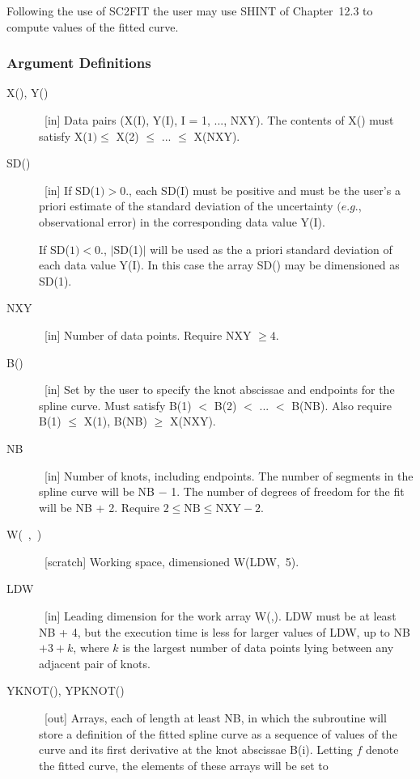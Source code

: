 \documentclass[twoside]{MATH77}
\begin{document}
Following the use of SC2FIT the user may use SHINT of Chapter~12.3 to compute
values of the fitted curve.

\subsubsection{Argument Definitions}
\begin{description}
\item[X(), Y()]  \ [in] Data pairs (X(I), Y(I), I = 1, ..., NXY). The
contents of X() must satisfy X($1)\leq $ X(2) $\leq $ ... $\leq $ X(NXY).

\item[SD()]  \ [in] If SD($1)>0.$, each SD(I) must be positive and must be
the user's a priori estimate of the standard deviation of the uncertainty $%
(e.g.$, observational error) in the corresponding data value Y(I).

If SD($1)<0.$, $|$SD(1)$|$ will be used as the a priori standard deviation
of each data value Y(I). In this case the array SD() may be dimensioned as
SD(1).

\item[NXY]  \ [in] Number of data points. Require NXY $\geq 4.$

\item[B()]  \ [in] Set by the user to specify the knot abscissae and
endpoints for the spline curve. Must satisfy B(1) $<$ B(2)
$<$ ... $<$ B(NB).  Also require B(1) $\leq $
X(1), B(NB) $\geq $ X(NXY).

\item[NB]  \ [in] Number of knots, including endpoints. The number of
segments in the spline curve will be NB $-$ 1. The number of degrees of freedom
for the fit will be NB + 2. Require $2\leq \text{NB}\leq \text{NXY}-2.$

\item[W(\ ,\ )]  \ [scratch] Working space, dimensioned W(LDW,~5).

\item[LDW]  \ [in] Leading dimension for the work array W(,). LDW must be at
least NB + 4, but the execution time is less for larger values of LDW, up to
NB$+3+k$, where $k$ is the largest number of data points lying between any
adjacent pair of knots.

\item[YKNOT(), YPKNOT()]  \ [out] Arrays, each of length at least NB, in
which the subroutine will store a definition of the fitted spline curve as a
sequence of values of the curve and its first derivative at the knot
abscissae B(i). Letting $f$ denote the fitted curve, the elements of these
arrays will be set to


\end{description}
\end{document}
